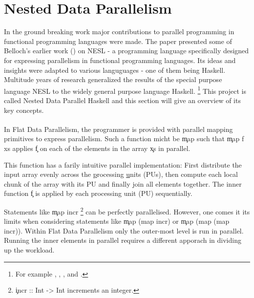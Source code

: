 \section{Nested Data Parallelism}
  \label{ndpintro}
  In the ground breaking work \cite{Belloch1996}
  major contributions to parallel programming in
  functional programming languages were made.
  The paper presented some of Belloch's earlier work (\cite{NepaBelloch1993}) on NESL
  - a programming language specifically designed for expressing parallelism
  in functional programming languages. Its ideas and insights were
  adapted to various languguages - one of them being Haskell.
  Multitude years of research generalized the
  results of the special purpose language NESL
  to the widely general purpose language Haskell.
  \footnote{For example \cite{Harness2008}, \cite{DPHStatus2007},
  \cite{EffiVect2012Lipp}, \cite{HighOrdFlat2006} and \cite{DistTypes1999}.}
  This project is called Nested Data Parallel Haskell and this section will give
  an overview of its key concepts.
  
  \paragraph{}
    In Flat Data Parallelism, the programmer is provided with parallel mapping primitives
    to express parallelism. Such a function micht be \c{map} such that \c{map f xs} applies \c{f}
    on each of the elements in the array \c{xs} in parallel.
    
    This function has a farily intuitive parallel implementation:
    First distribute the input array evenly across the \underline{p}rocessing \underline{u}nits (PUs),
    then compute each local chunk of the array with its PU and finally join all elements together.
    The inner function \c{f} is applied by each processing unit (PU) sequentially.
    
    Statements like \c{map incr}
    \footnote{\c{incr :: Int -> Int} increments an integer.}
    can be perfectly parallelised.
    However, one comes it its limits when considering statements like \c{map (map incr)} or \c{map (map (map incr))}.
    Within Flat Data Parallelism only the outer-most level is run in parallel.
    Running the inner elements in parallel requires a different apporach in dividing up the workload.
    
